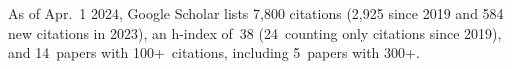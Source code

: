 %
As of Apr.~1 2024, Google Scholar lists
7,800 citations (2,925 since 2019 and 584 new citations in 2023),
an h-index of~38 (24~counting only citations since 2019),
and 14~papers with 100+~citations, including 5~papers with 300+.
